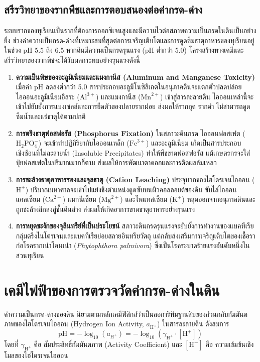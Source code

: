 \subsection{สรีรวิทยาของรากพืชและการตอบสนองต่อค่ากรด-ด่าง}
ระบบรากของทุเรียนเป็นรากที่ต้องการออกซิเจนสูงและมีความไวต่อสภาพความเป็นกรดในดินเป็นอย่างยิ่ง ช่วงค่าความเป็นกรด-ด่างที่เหมาะสมที่สุดต่อการเจริญเติบโตและการดูดซึมธาตุอาหารของทุเรียนอยู่ในช่วง pH 5.5 ถึง 6.5 หากดินมีความเป็นกรดรุนแรง (pH ต่ำกว่า 5.0) โครงสร้างทางเคมีและสรีรวิทยาของรากพืชจะได้รับผลกระทบอย่างรุนแรงดังนี้
\begin{enumerate}
    \item \textbf{ความเป็นพิษของอะลูมิเนียมและแมงกานีส (Aluminum and Manganese Toxicity)} เมื่อค่า pH ลดลงต่ำกว่า 5.0 สารประกอบอะลูมิโนซิลิเกตในอนุภาคดินจะแตกตัวปลดปล่อยไอออนอะลูมิเนียมอิสระ ($\text{Al}^{3+}$) และแมงกานีส ($\text{Mn}^{2+}$) เข้าสู่สารละลายดิน ไอออนเหล่านี้จะเข้าไปยับยั้งการแบ่งเซลล์และการยืดตัวของปลายรากฝอย ส่งผลให้รากกุด รากดำ ไม่สามารถดูดซึมน้ำและแร่ธาตุได้ตามปกติ
    \item \textbf{การตรึงธาตุฟอสฟอรัส (Phosphorus Fixation)} ในสภาวะดินกรด ไอออนฟอสเฟต ($\text{H}_2\text{PO}_4^-$) จะเข้าทำปฏิกิริยากับไอออนเหล็ก ($\text{Fe}^{3+}$) และอะลูมิเนียม เกิดเป็นสารประกอบเชิงซ้อนที่ไม่ละลายน้ำ (Insoluble Precipitates) ทำให้พืชขาดฟอสฟอรัส แม้เกษตรกรจะใส่ปุ๋ยฟอสเฟตในปริมาณมากก็ตาม ส่งผลให้การพัฒนาตาดอกและการติดผลล้มเหลว
    \item \textbf{การชะล้างธาตุอาหารรองและจุลธาตุ (Cation Leaching)} ประจุบวกของไฮโดรเจนไอออน ($\text{H}^+$) ปริมาณมหาศาลจะเข้าไปแย่งชิงตำแหน่งดูดซับบนผิวคอลลอยด์ของดิน ขับไล่ไอออนแคลเซียม ($\text{Ca}^{2+}$) แมกนีเซียม ($\text{Mg}^{2+}$) และโพแทสเซียม ($\text{K}^+$) หลุดออกจากอนุภาคดินและถูกชะล้างลึกลงสู่ชั้นดินล่าง ส่งผลให้เกิดอาการขาดธาตุอาหารอย่างรุนแรง
    \item \textbf{การหยุดชะงักของจุลินทรีย์ที่เป็นประโยชน์} สภาวะดินกรดรุนแรงจะยับยั้งการทำงานของแบคทีเรียกลุ่มตรึงไนโตรเจนและแบคทีเรียย่อยสลายอินทรียวัตถุ แต่กลับส่งเสริมการเจริญเติบโตของเชื้อราก่อโรครากเน่าโคนเน่า (\textit{Phytophthora palmivora}) ซึ่งเป็นโรคระบาดร้ายแรงอันดับหนึ่งในสวนทุเรียน
\end{enumerate}

\section{เคมีไฟฟ้าของการตรวจวัดค่ากรด-ด่างในดิน}

ค่าความเป็นกรด-ด่างของดิน นิยามตามหลักเคมีฟิสิกส์ว่าเป็นลอการิทึมฐานสิบของส่วนกลับกัมมันตภาพของไฮโดรเจนไอออน (Hydrogen Ion Activity, $a_{\text{H}^+}$) ในสารละลายดิน ดังสมการ
\begin{equation}
\text{pH} = -\log_{10}(a_{\text{H}^+}) = -\log_{10}(\gamma_{\text{H}^+} \cdot [\text{H}^+])
\end{equation}
โดยที่ $\gamma_{\text{H}^+}$ คือ สัมประสิทธิ์กัมมันตภาพ (Activity Coefficient) และ $[\text{H}^+]$ คือ ความเข้มข้นเชิงโมลของไฮโดรเจนไอออน

